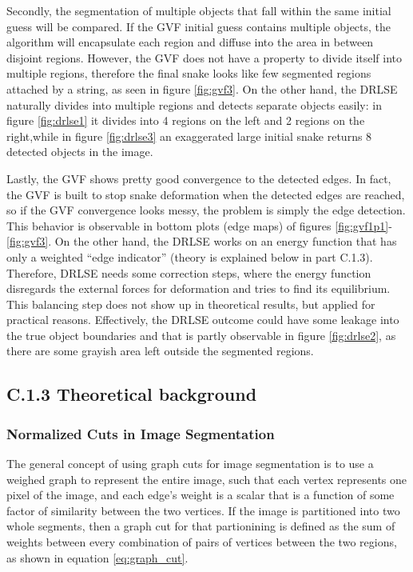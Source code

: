 \documentclass{article}
\begin{document}
Secondly, the segmentation of multiple objects that fall within the same initial guess will be compared. If the GVF initial guess contains multiple objects, the algorithm will encapsulate each region and diffuse into the area in between disjoint regions. However, the GVF does not have a property to divide itself into multiple regions, therefore the final snake looks like few segmented regions attached by a string, as seen in figure \ref{fig:gvf3}. On the other hand, the DRLSE naturally divides into multiple regions and detects separate objects easily: in figure \ref{fig:drlse1} it divides into 4 regions on the left and 2 regions on the right,while in figure \ref{fig:drlse3} an exaggerated large initial snake returns 8 detected objects in the image.

Lastly, the GVF shows pretty good convergence to the detected edges. In fact, the GVF is built to stop snake deformation when the detected edges are reached, so if the GVF convergence looks messy, the problem is simply the edge detection. This behavior is observable in bottom plots (edge maps) of figures \ref{fig:gvf1p1}-\ref{fig:gvf3}. On the other hand, the DRLSE works on an energy function that has only a weighted ``edge indicator'' (theory is explained below in part C.1.3). Therefore, DRLSE needs some correction steps, where the energy function disregards the external forces for deformation and tries to find its equilibrium. This balancing step does not show up in theoretical results, but applied for practical reasons. Effectively, the DRLSE outcome could have some leakage into the true object boundaries and that is partly observable in figure \ref{fig:drlse2}, as there are some grayish area left outside the segmented regions.


\subsection*{C.1.3 Theoretical background}



\subsubsection*{Normalized Cuts in Image Segmentation}

The general concept of using graph cuts for image segmentation is to use a weighed graph to represent the entire image, such that each vertex represents one pixel of the image, and each edge's weight is a scalar that is a function of some factor of similarity between the two vertices. If the image is partitioned into two whole segments, then a graph cut for that partionining is defined as the sum of weights between every combination of pairs of vertices between the two regions, as shown in equation \ref{eq:graph_cut}.
\end{document}
